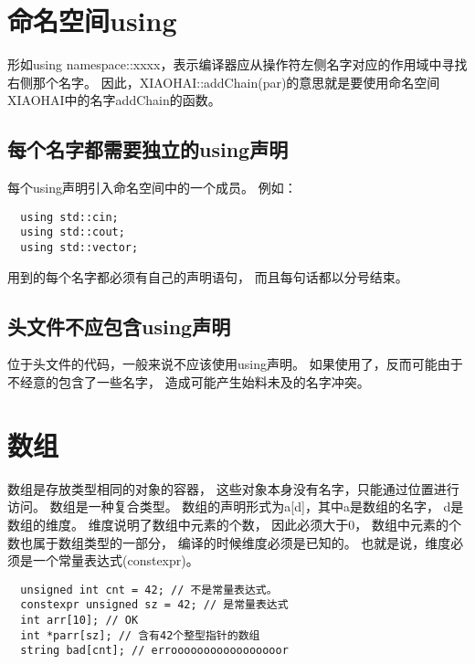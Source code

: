 \section{命名空间using}
形如using namespace::xxxx，表示编译器应从操作符左侧名字对应的作用域中寻找右侧那个名字。%
因此，XIAOHAI::addChain(par)的意思就是要使用命名空间XIAOHAI中的名字addChain的函数。%
\subsection{每个名字都需要独立的using声明}
每个using声明引入命名空间中的一个成员。%
例如：
\begin{lstlisting}
  using std::cin;
  using std::cout;
  using std::vector;
\end{lstlisting}
用到的每个名字都必须有自己的声明语句，%
而且每句话都以分号结束。%
\subsection{头文件不应包含using声明}
位于头文件的代码，一般来说不应该使用using声明。%
如果使用了，反而可能由于不经意的包含了一些名字，%
造成可能产生始料未及的名字冲突。%

\section{数组}
数组是存放类型相同的对象的容器，%
这些对象本身没有名字，只能通过位置进行访问。%
数组是一种复合类型。%
数组的声明形式为a[d]，其中a是数组的名字，%
d是数组的维度。%
维度说明了数组中元素的个数，%
因此必须大于0，%
数组中元素的个数也属于数组类型的一部分，%
编译的时候维度必须是已知的。%
也就是说，维度必须是一个常量表达式(constexpr)。%
\begin{lstlisting}
  unsigned int cnt = 42; // 不是常量表达式。
  constexpr unsigned sz = 42; // 是常量表达式
  int arr[10]; // OK
  int *parr[sz]; // 含有42个整型指针的数组
  string bad[cnt]; // errooooooooooooooooor
\end{lstlisting}



